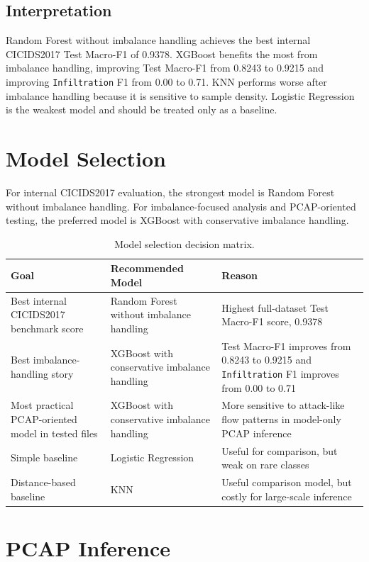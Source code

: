 \documentclass[12pt,a4paper]{article}
\begin{document}
\subsection{Interpretation}

Random Forest without imbalance handling achieves the best internal CICIDS2017 Test Macro-F1 of 0.9378. XGBoost benefits the most from imbalance handling, improving Test Macro-F1 from 0.8243 to 0.9215 and improving \texttt{Infiltration} F1 from 0.00 to 0.71. KNN performs worse after imbalance handling because it is sensitive to sample density. Logistic Regression is the weakest model and should be treated only as a baseline.

\section{Model Selection}

For internal CICIDS2017 evaluation, the strongest model is Random Forest without imbalance handling. For imbalance-focused analysis and PCAP-oriented testing, the preferred model is XGBoost with conservative imbalance handling.

{\small
\begin{longtable}{p{} p{} p{}}
\caption{Model selection decision matrix.}\\
\toprule
\textbf{Goal} & \textbf{Recommended Model} & \textbf{Reason} \\
\midrule
Best internal CICIDS2017 benchmark score & Random Forest without imbalance handling & Highest full-dataset Test Macro-F1 score, 0.9378 \\
Best imbalance-handling story & XGBoost with conservative imbalance handling & Test Macro-F1 improves from 0.8243 to 0.9215 and \texttt{Infiltration} F1 improves from 0.00 to 0.71 \\
Most practical PCAP-oriented model in tested files & XGBoost with conservative imbalance handling & More sensitive to attack-like flow patterns in model-only PCAP inference \\
Simple baseline & Logistic Regression & Useful for comparison, but weak on rare classes \\
Distance-based baseline & KNN & Useful comparison model, but costly for large-scale inference \\
\bottomrule
\end{longtable}
}

\section{PCAP Inference}
\end{document}
